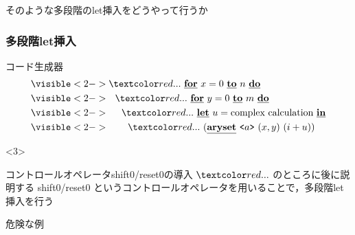 \begin{frame}
  \center
  \huge{そのような多段階のlet挿入をどうやって行うか}
\end{frame}

\begin{frame}
  \frametitle{多段階let挿入}
  コード生成器
  \begin{align*}
    & \visible<2->{\red{...}~} \cfordo{x = 0}{n} \\
    & \visible<2->{~~\red{...}~} \cfordo{y = 0}{m} \\
    & \visible<2->{~~~~\red{...}~} \cLet~u= \text{complex calculation}~\cIn \\
    & \visible<2->{~~~~~~\red{...}~} (\caryset{\code{a}}{(x,y)}{(i + u)})
  \end{align*}

  \begin{onlyenv}<3>
    \begin{exampleblock}{コントロールオペレータshift0/reset0の導入}
      $\red{...}$ のところに後に説明する shift0/reset0 というコントロールオペレータを用いることで，多段階let挿入を行う
    \end{exampleblock}
  \end{onlyenv}
\end{frame}


\begin{frame}
  \center
  \huge{危険な例}
\end{frame}


